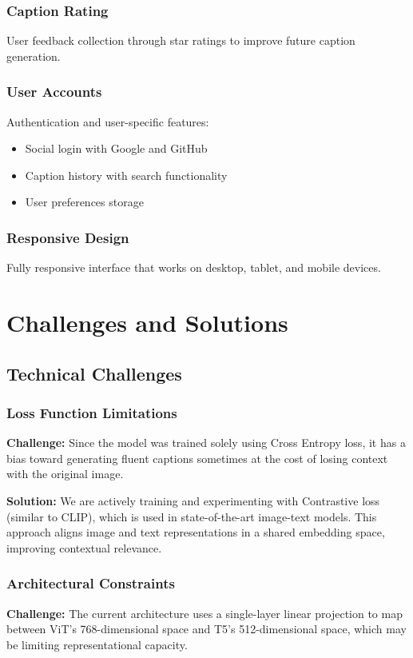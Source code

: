 \documentclass[12pt,a4paper]{report}
\begin{document}
\subsection{Caption Rating}
User feedback collection through star ratings to improve future caption generation.

\subsection{User Accounts}
Authentication and user-specific features:
\begin{itemize}
    \item Social login with Google and GitHub
    \item Caption history with search functionality
    \item User preferences storage
\end{itemize}

\subsection{Responsive Design}
Fully responsive interface that works on desktop, tablet, and mobile devices.

\chapter{Challenges and Solutions}

\section{Technical Challenges}
\subsection{Loss Function Limitations}
\textbf{Challenge:} Since the model was trained solely using Cross Entropy loss, it has a bias toward generating fluent captions sometimes at the cost of losing context with the original image.

\textbf{Solution:} We are actively training and experimenting with Contrastive loss (similar to CLIP), which is used in state-of-the-art image-text models. This approach aligns image and text representations in a shared embedding space, improving contextual relevance.

\subsection{Architectural Constraints}
\textbf{Challenge:} The current architecture uses a single-layer linear projection to map between ViT's 768-dimensional space and T5's 512-dimensional space, which may be limiting representational capacity.
\end{document}
